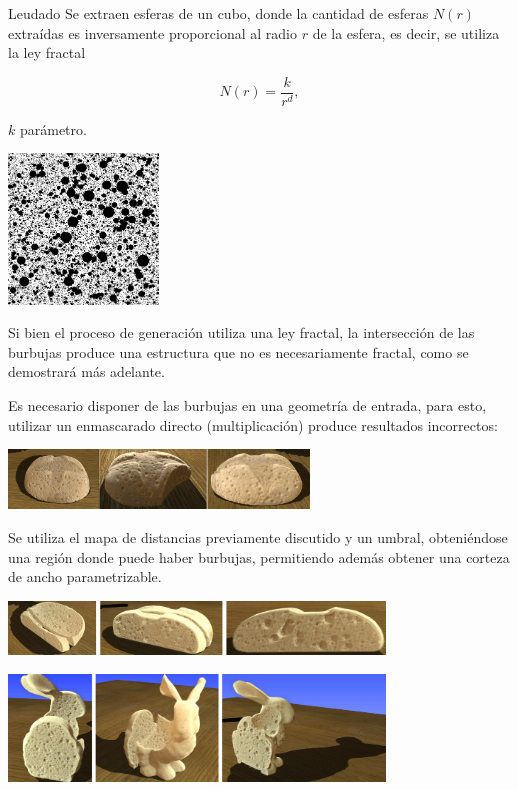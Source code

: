 \documentclass[spanish]{beamer}
\begin{document}
\begin{frame}{Leudado}
Se extraen esferas de un cubo, donde la cantidad de esferas $N(r)$ extraídas es inversamente proporcional al radio $r$ de la esfera, es decir, se utiliza la ley fractal

\begin{equation*}
N(r) = \frac{k}{r^{d}},
\end{equation*}

$k$ parámetro.

\centerline{\includegraphics[height=4cm]{../figures/bubbles}}
\end{frame}

\begin{frame}
Si bien el proceso de generación utiliza una ley fractal, la intersección de las burbujas produce una estructura que no es necesariamente fractal, como se demostrará más adelante.

\vspace{1cm}

Es necesario disponer de las burbujas en una geometría de entrada, para esto, utilizar un enmascarado directo (multiplicación) produce resultados incorrectos:

\centerline{\includegraphics[width=8cm]{../figures/intersectProblem}}
\end{frame}

\begin{frame}
Se utiliza el mapa de distancias previamente discutido y un umbral, obteniéndose una región donde puede haber burbujas, permitiendo además obtener una corteza de ancho parametrizable.


\centerline{\includegraphics[width=10cm]{../figures/prebakebread}}
\centerline{\includegraphics[width=10cm]{../figures/prebakebunny}}
\end{frame}
\end{document}
